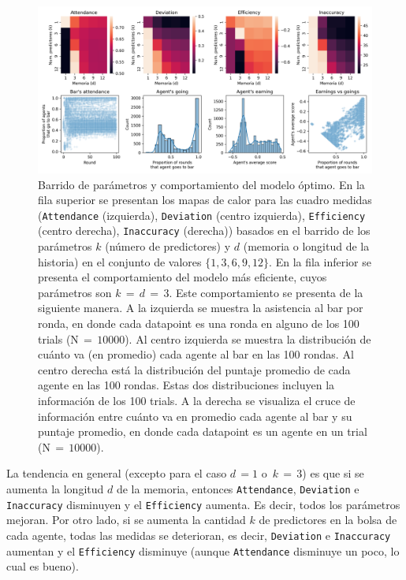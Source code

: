 \documentclass[11pt]{amsart}
\begin{document}
\begin{figure}
\begin{center}
\includegraphics[width=.9\linewidth]{./Figuras/Figura1.png}
\caption{Barrido de parámetros y comportamiento del modelo óptimo. En la fila superior se presentan los mapas de calor para las cuadro medidas (\texttt{Attendance} (izquierda), \texttt{Deviation} (centro izquierda), \texttt{Efficiency} (centro derecha), \texttt{Inaccuracy} (derecha)) basados en el barrido de los parámetros $k$ (número de predictores) y $d$ (memoria o longitud de la historia) en el conjunto de valores $\{1,3,6,9,12\}$. En la fila inferior se presenta el comportamiento del modelo más eficiente, cuyos parámetros son $k\,{=}\,d\,{=}\,3$. Este comportamiento se presenta de la siguiente manera. A la izquierda se muestra la asistencia al bar por ronda, en donde cada datapoint es una ronda en alguno de los 100 trials ($\mbox{N}\,{=}\,10000$). Al centro izquierda se muestra la distribución de cuánto va (en promedio) cada agente al bar en las 100 rondas. Al centro derecha está la distribución del puntaje promedio de cada agente en las 100 rondas. Estas dos distribuciones incluyen la información de los 100 trials. A la derecha se visualiza el cruce de información entre cuánto va en promedio cada agente al bar y su puntaje promedio, en donde cada datapoint es un agente en un trial ($\mbox{N}\,{=}\,10000$).}\label{fig:heat}
\end{center}
\end{figure}

La tendencia en general (excepto para el caso $d\,{=}1$ o $\,k\,{=}\,3$) es que si se aumenta la longitud $d$ de la memoria, entonces \texttt{Attendance}, \texttt{Deviation} e \texttt{Inaccuracy} disminuyen y el \texttt{Efficiency} aumenta. Es decir, todos los parámetros mejoran. Por otro lado, si se aumenta la cantidad $k$ de predictores en la bolsa de cada agente, todas las medidas se deterioran, es decir, \texttt{Deviation} e \texttt{Inaccuracy} aumentan y el \texttt{Efficiency} disminuye (aunque \texttt{Attendance} disminuye un poco, lo cual es bueno).
\end{document}
